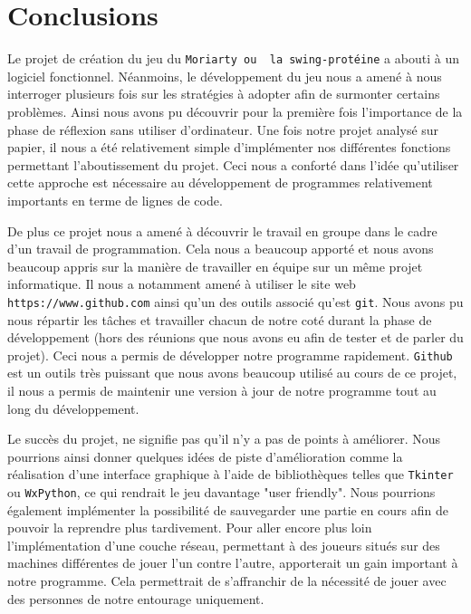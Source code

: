 \section{Conclusions}
Le projet de création du jeu du \verb|Moriarty ou  la swing-protéine| a abouti à un logiciel fonctionnel. Néanmoins, le développement du jeu nous a amené à nous interroger plusieurs fois sur les stratégies à adopter afin de surmonter certains problèmes. Ainsi nous avons pu découvrir pour la première fois l'importance de la phase de réflexion sans utiliser d'ordinateur. Une fois notre projet analysé sur papier, il nous a été relativement simple d'implémenter nos différentes fonctions permettant l'aboutissement du projet. Ceci nous a conforté dans l'idée qu'utiliser cette approche est nécessaire au développement de programmes relativement importants en terme de lignes de code.


De plus ce projet nous a amené à découvrir le travail en groupe dans le cadre d'un travail de programmation. Cela nous a beaucoup apporté et nous avons beaucoup appris sur la manière de travailler en équipe sur un même projet informatique. Il nous a notamment amené à utiliser le site web \verb|https://www.github.com| ainsi qu'un des outils associé qu'est \verb|git|. Nous avons pu nous répartir les tâches et travailler chacun de notre coté durant la phase de développement (hors des réunions que nous avons eu afin de tester et de parler du projet). Ceci nous a permis de développer notre programme rapidement. \verb|Github| est un outils très puissant que nous avons beaucoup utilisé au cours de ce projet, il nous a permis de maintenir une version à jour de notre programme tout au long du développement. 


Le succès du projet, ne signifie pas qu'il n'y a pas de points à améliorer. Nous pourrions ainsi donner quelques idées de piste d'amélioration comme la réalisation d'une interface graphique à l'aide de bibliothèques telles que \verb|Tkinter| ou \verb|WxPython|, ce qui rendrait le jeu davantage "user friendly". Nous pourrions également implémenter la possibilité de sauvegarder une partie en cours afin de pouvoir la reprendre plus tardivement. Pour aller encore plus loin l'implémentation d'une couche réseau, permettant à des joueurs situés sur des machines différentes de jouer l'un contre l'autre, apporterait un gain important à notre programme. Cela permettrait de s'affranchir de la nécessité de jouer avec des personnes de notre entourage uniquement.\\


